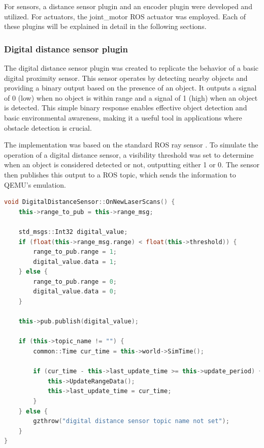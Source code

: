 \documentclass[../../monografia.tex]{subfiles}
\begin{document}
For sensors, a distance sensor plugin and an encoder plugin were developed and utilized. For actuators, the joint\_motor ROS actuator was employed. Each of these plugins will be explained in detail in the following sections.



\subsubsection{Digital distance sensor plugin}
The digital distance sensor plugin was created to replicate the behavior of a basic digital proximity sensor. This sensor operates by detecting nearby objects and providing a binary output based on the presence of an object. It outputs a signal of 0 (low) when no object is within range and a signal of 1 (high) when an object is detected. This simple binary response enables effective object detection and basic environmental awareness, making it a useful tool in applications where obstacle detection is crucial.

The implementation was based on the standard ROS ray sensor \cite{ROS_Ray_Sensor_23}. To simulate the operation of a digital distance sensor, a visibility threshold was set to determine when an object is considered detected or not, outputting either 1 or 0. The sensor then publishes this output to a ROS topic, which sends the information to QEMU’s emulation.

\begin{lstlisting}[language=C++, caption={Digital distance sensor simulation with ray plugin}]
void DigitalDistanceSensor::OnNewLaserScans() {
    this->range_to_pub = this->range_msg;

    std_msgs::Int32 digital_value;
    if (float(this->range_msg.range) < float(this->threshold)) {
        range_to_pub.range = 1;
        digital_value.data = 1;
    } else {
        range_to_pub.range = 0;
        digital_value.data = 0;
    }

    this->pub.publish(digital_value);

    if (this->topic_name != "") {
        common::Time cur_time = this->world->SimTime();

        if (cur_time - this->last_update_time >= this->update_period) {
            this->UpdateRangeData();
            this->last_update_time = cur_time;
        }
    } else {
        gzthrow("digital distance sensor topic name not set");
    }
}
\end{lstlisting}

\end{document}
